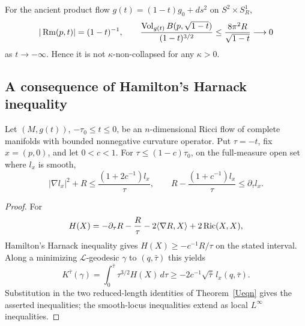 \begin{example}\label{ex:cylinder-with-circle-not-kappa-noncollapsed}

For the ancient product flow
$g(t)=(1-t)g_0+ds^2$ on $S^2\times S^1_R$,
\[
 |\operatorname{Rm}(p,t)|=(1-t)^{-1},\qquad
 \frac{\operatorname{Vol}_{g(t)}B(p,\sqrt{1-t})}{(1-t)^{3/2}}
 \leq\frac{8\pi^2R}{\sqrt{1-t}}\longrightarrow0
\]
as $t\to-\infty$. Hence it is not $\kappa$-non-collapsed for any
$\kappa>0$.
\end{example}

\subsection{A consequence of Hamilton's Harnack inequality}

\begin{proposition}\label{prop:harnack-l-function-lipschitz-bound}
\label{uniformlip}

Let $(M,g(t))$, $-\tau_0\leq t\leq0$, be an $n$-dimensional Ricci
flow of complete manifolds with bounded nonnegative curvature
operator. Put $\tau=-t$, fix $x=(p,0)$, and let $0<c<1$. For
$\tau\leq(1-c)\tau_0$, on the full-measure open set where $l_x$ is
smooth,
\[
 |\nabla l_x|^2+R\leq\frac{(1+2c^{-1})l_x}{\tau},
 \qquad
 R-\frac{(1+c^{-1})l_x}{\tau}\leq\partial_\tau l_x.
\]
\end{proposition}
\begin{proof}
\sketch For
\[
 H(X)=-\partial_\tau R-\frac R\tau-2\langle\nabla R,X\rangle
       +2\operatorname{Ric}(X,X),
\]
Hamilton's Harnack inequality gives
$H(X)\geq-c^{-1}R/\tau$ on the stated interval. Along a minimizing
$\mathcal L$-geodesic $\gamma$ to $(q,\bar\tau)$ this yields
\begin{equation}\label{Kbartaueqn}
 K^{\bar\tau}(\gamma)
 =\int_0^{\bar\tau}\tau^{3/2}H(X)\,d\tau
 \geq-2c^{-1}\sqrt{\bar\tau}\,l_x(q,\bar\tau).
\end{equation}
Substitution in the two reduced-length identities of
Theorem~\ref{Ueqn} gives the asserted inequalities; the smooth-locus
inequalities extend as local $L^\infty$ inequalities.
\end{proof}

